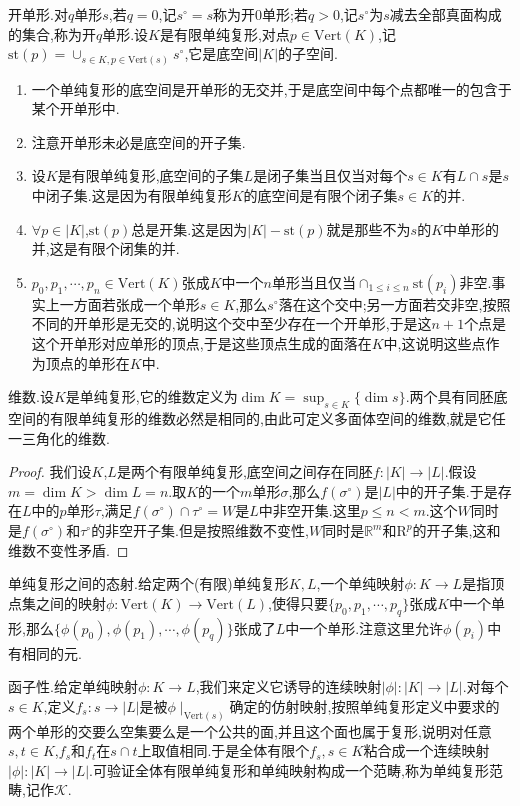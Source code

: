 开单形.对$q$单形$s$,若$q=0$,记$s^{\circ}=s$称为开$0$单形;若$q>0$,记$s^{\circ}$为$s$减去全部真面构成的集合,称为开$q$单形.设$K$是有限单纯复形,对点$p\in\mathrm{Vert}(K)$,记$\mathrm{st}(p)=\cup_{s\in K,p\in\mathrm{Vert}(s)}s^{\circ}$,它是底空间$|K|$的子空间.
\begin{enumerate}
	\item 一个单纯复形的底空间是开单形的无交并,于是底空间中每个点都唯一的包含于某个开单形中.
	\item 注意开单形未必是底空间的开子集.
	\item 设$K$是有限单纯复形,底空间的子集$L$是闭子集当且仅当对每个$s\in K$有$L\cap s$是$s$中闭子集.这是因为有限单纯复形$K$的底空间是有限个闭子集$s\in K$的并.
	\item $\forall p\in |K|$,$\mathrm{st}(p)$总是开集.这是因为$|K|-\mathrm{st}(p)$就是那些不为$s$的$K$中单形的并,这是有限个闭集的并.
	\item $p_0,p_1,\cdots,p_n\in\mathrm{Vert}(K)$张成$K$中一个$n$单形当且仅当$\cap_{1\le i\le n}\mathrm{st}(p_i)$非空.事实上一方面若张成一个单形$s\in K$,那么$s^{\circ}$落在这个交中;另一方面若交非空,按照不同的开单形是无交的,说明这个交中至少存在一个开单形,于是这$n+1$个点是这个开单形对应单形的顶点,于是这些顶点生成的面落在$K$中,这说明这些点作为顶点的单形在$K$中.
\end{enumerate}

维数.设$K$是单纯复形,它的维数定义为$\dim K=\sup_{s\in K}\{\dim s\}$.两个具有同胚底空间的有限单纯复形的维数必然是相同的,由此可定义多面体空间的维数,就是它任一三角化的维数.
\begin{proof}
	
	我们设$K$,$L$是两个有限单纯复形,底空间之间存在同胚$f:|K|\to|L|$.假设$m=\dim K>\dim L=n$.取$K$的一个$m$单形$\sigma$,那么$f(\sigma^{\circ})$是$|L|$中的开子集.于是存在$L$中的$p$单形$\tau$,满足$f(\sigma^{\circ})\cap\tau^{\circ}=W$是$L$中非空开集.这里$p\le n<m$.这个$W$同时是$f(\sigma^{\circ})$和$\tau^{\circ}$的非空开子集.但是按照维数不变性,$W$同时是$\mathbb{R}^m$和$\mathrm{R}^p$的开子集,这和维数不变性矛盾.
\end{proof}

单纯复形之间的态射.给定两个(有限)单纯复形$K,L$,一个单纯映射$\phi:K\to L$是指顶点集之间的映射$\phi:\mathrm{Vert}(K)\to\mathrm{Vert}(L)$,使得只要$\{p_0,p_1,\cdots,p_q\}$张成$K$中一个单形,那么$\{\phi(p_0),\phi(p_1),\cdots,\phi(p_q)\}$张成了$L$中一个单形.注意这里允许$\phi(p_i)$中有相同的元.

函子性.给定单纯映射$\phi:K\to L$,我们来定义它诱导的连续映射$|\phi|:|K|\to|L|$.对每个$s\in K$,定义$f_s:s\to|L|$是被$\phi\mid_{\mathrm{Vert}(s)}$确定的仿射映射,按照单纯复形定义中要求的两个单形的交要么空集要么是一个公共的面,并且这个面也属于复形,说明对任意$s,t\in K$,$f_s$和$f_t$在$s\cap t$上取值相同.于是全体有限个$f_s,s\in K$粘合成一个连续映射$|\phi|:|K|\to|L|$.可验证全体有限单纯复形和单纯映射构成一个范畴,称为单纯复形范畴,记作$\mathscr{K}$.


